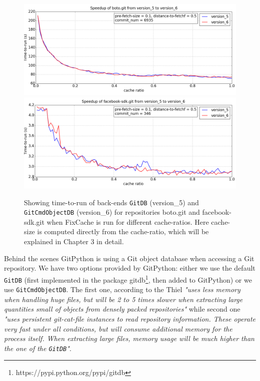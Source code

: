 \documentclass[12pt,twoside,notitlepage]{report}
\newcommand{\fxch}{FixCache}
\begin{document}
\begin{figure}[h]
\includegraphics[width=1.0\textwidth]{db_backend-1.png}
\includegraphics[width=1.0\textwidth]{db_backend-2.png}

\captionsetup{width=0.95\textwidth}
\caption{Showing time-to-run of back-ends \texttt{GitDB} (version\_5) and \texttt{GitCmdObjectDB} (version\_6) for repositories boto.git and facebook-sdk.git when \fxch{} is run for different cache-ratios. Here cache-size is computed directly from the cache-ratio, which will be explained in Chapter 3 in detail.}
\label{boto_gitdb}
\end{figure}
Behind the scenes GitPython is using a Git object database when accessing a Git repository. We have two options provided by GitPython: either we use the default \texttt{GitDB} (first implemented in the package gitdb\footnote{https://pypi.python.org/pypi/gitdb}, then added to GitPython) or we use \texttt{GitCmdObjectDB}. The first one, according to the Thiel \textit{"uses less memory when handling huge files, but will be 2 to 5 times slower when extracting large quantities
small of objects from densely packed repositories"} while second one \textit{"uses persistent git-cat-file instances to read repository information. These operate very fast under all conditions, but will consume additional memory for the process itself. When extracting large files, memory
usage will be much higher than the one of the \texttt{GitDB}"}.
\end{document}
